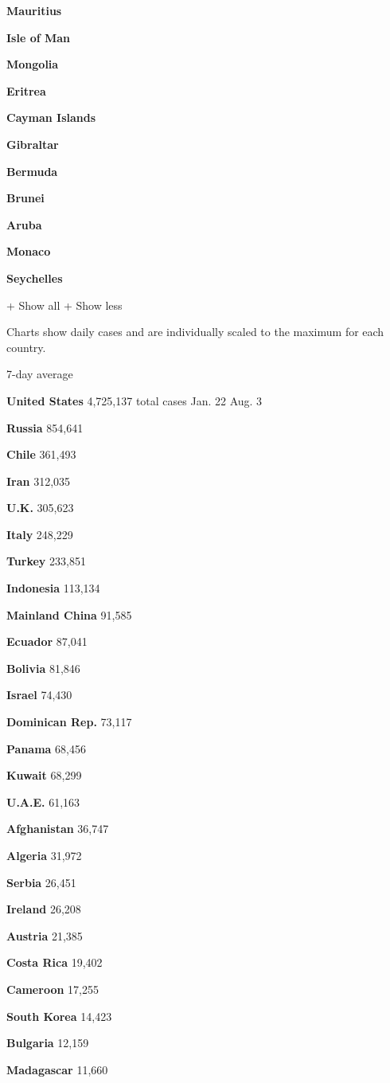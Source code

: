 \textbf{Mauritius}

\textbf{Isle of Man}

\textbf{Mongolia}

\textbf{Eritrea}

\textbf{Cayman Islands}

\textbf{Gibraltar}

\textbf{Bermuda}

\textbf{Brunei}

\textbf{Aruba}

\textbf{Monaco}

\textbf{Seychelles}

+ Show all + Show less

Charts show daily cases and are individually scaled to the maximum for
each country.

7-day average

\textbf{United States} 4,725,137 total cases Jan. 22 Aug. 3

\textbf{Russia} 854,641

\textbf{Chile} 361,493

\textbf{Iran} 312,035

\textbf{U.K.} 305,623

\textbf{Italy} 248,229

\textbf{Turkey} 233,851

\textbf{Indonesia} 113,134

\textbf{Mainland China} 91,585

\textbf{Ecuador} 87,041

\textbf{Bolivia} 81,846

\textbf{Israel} 74,430

\textbf{Dominican Rep.} 73,117

\textbf{Panama} 68,456

\textbf{Kuwait} 68,299

\textbf{U.A.E.} 61,163

\textbf{Afghanistan} 36,747

\textbf{Algeria} 31,972

\textbf{Serbia} 26,451

\textbf{Ireland} 26,208

\textbf{Austria} 21,385

\textbf{Costa Rica} 19,402

\textbf{Cameroon} 17,255

\textbf{South Korea} 14,423

\textbf{Bulgaria} 12,159

\textbf{Madagascar} 11,660

